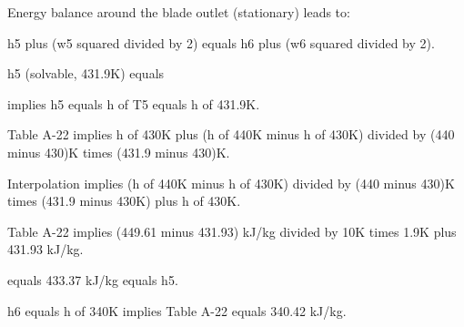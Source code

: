 Energy balance around the blade outlet (stationary) leads to:

h5 plus (w5 squared divided by 2) equals h6 plus (w6 squared divided by 2).

h5 (solvable, 431.9K) equals

implies h5 equals h of T5 equals h of 431.9K.

Table A-22 implies h of 430K plus (h of 440K minus h of 430K) divided by (440 minus 430)K times (431.9 minus 430)K.

Interpolation implies (h of 440K minus h of 430K) divided by (440 minus 430)K times (431.9 minus 430K) plus h of 430K.

Table A-22 implies (449.61 minus 431.93) kJ/kg divided by 10K times 1.9K plus 431.93 kJ/kg.

equals 433.37 kJ/kg equals h5.

h6 equals h of 340K implies Table A-22 equals 340.42 kJ/kg.